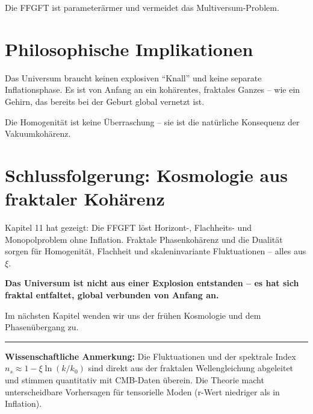 	Die FFGFT ist parameterärmer und vermeidet das Multiversum-Problem.
	
	\section{Philosophische Implikationen}
	
	Das Universum braucht keinen explosiven \enquote{Knall} und keine separate Inflationsphase. Es ist von Anfang an ein kohärentes, fraktales Ganzes – wie ein Gehirn, das bereits bei der Geburt global vernetzt ist.
	
	Die Homogenität ist keine Überraschung – sie ist die natürliche Konsequenz der Vakuumkohärenz.
	
	\section{Schlussfolgerung: Kosmologie aus fraktaler Kohärenz}
	
	Kapitel 11 hat gezeigt: Die FFGFT löst Horizont-, Flachheits- und Monopolproblem ohne Inflation. Fraktale Phasenkohärenz und die Dualität sorgen für Homogenität, Flachheit und skaleninvariante Fluktuationen – alles aus \(\xi\).
	
	\textbf{Das Universum ist nicht aus einer Explosion entstanden – es hat sich fraktal entfaltet, global verbunden von Anfang an.}
	
	Im nächsten Kapitel wenden wir uns der frühen Kosmologie und dem Phasenübergang zu.
	
	\vspace{1cm}
	\hrule
	\vspace{0.5cm}
	\noindent\textbf{Wissenschaftliche Anmerkung:} Die Fluktuationen und der spektrale Index \(n_s \approx 1 - \xi \ln(k/k_0)\) sind direkt aus der fraktalen Wellengleichung abgeleitet und stimmen quantitativ mit CMB-Daten überein. Die Theorie macht unterscheidbare Vorhersagen für tensorielle Moden (r-Wert niedriger als in Inflation).




